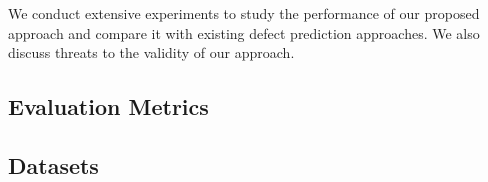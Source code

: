 We conduct extensive experiments to study the performance of our proposed approach and compare it with existing defect prediction approaches. We also discuss threats to the validity of our approach.

\subsection{Evaluation Metrics}
\label{sec:metrics}


\subsection{Datasets}
\label{sec:dataset}


%

